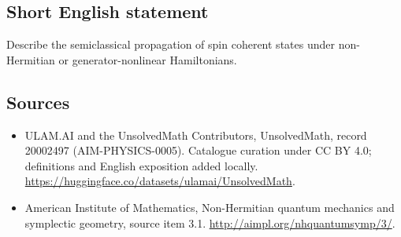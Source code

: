 \documentclass[11pt]{article}
\begin{document}
\subsection{Short English statement}
Describe the semiclassical propagation of spin coherent states under non-Hermitian or generator-nonlinear Hamiltonians.
\subsection{Sources}
\begin{itemize}
\item[\hypertarget{source:20002497:1}{S1}] ULAM.AI and the UnsolvedMath Contributors, UnsolvedMath, record 20002497 (AIM-PHYSICS-0005). Catalogue curation under CC BY 4.0; definitions and English exposition added locally.
\url{https://huggingface.co/datasets/ulamai/UnsolvedMath}.
\item[\hypertarget{source:20002497:2}{S2}] American Institute of Mathematics, Non-Hermitian quantum mechanics and symplectic geometry, source item 3.1.
\url{http://aimpl.org/nhquantumsymp/3/}.
\end{itemize}
\label{end:20002497}
\end{document}
